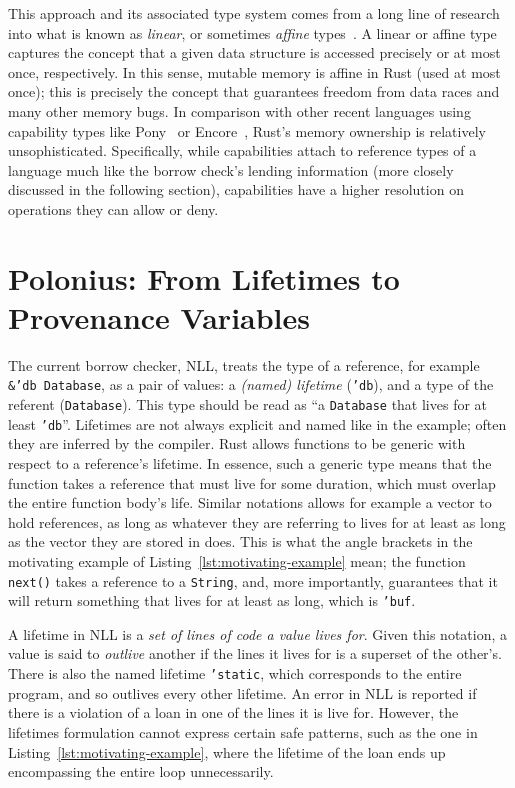 \documentclass[11pt,a4paper,twoside,openany]{report}
\newcommand{\InRust}[1]{\texttt{#1}}
\begin{document}
This approach and its associated type system comes from a long line of research
into what is known as \textit{linear}, or sometimes \textit{affine}
types~\cite{wadler1990linear}. A linear or affine type captures the concept that
a given data structure is accessed precisely or at most once, respectively. In
this sense, mutable memory is affine in Rust (used at most once); this is
precisely the concept that guarantees freedom from data races and many other
memory bugs. In comparison with other recent languages using capability types
like Pony~\cite{clebsch2015pony, Clebsch:2015:DCS:2824815.2824816} or
Encore~\cite{castegren2018capability}, Rust's memory ownership is relatively
unsophisticated. Specifically, while capabilities attach to reference types of a
language much like the borrow check's lending information (more closely
discussed in the following section), capabilities have a higher resolution on
operations they can allow or deny.

\section{Polonius: From Lifetimes to Provenance
  Variables}\label{sec:reference-provenance}

The current borrow checker, NLL, treats the type of a reference, for example
\InRust{&'db Database}, as a pair of values: a \textit{(named) lifetime}
(\InRust{'db}), and a type of the referent (\InRust{Database}). This type should
be read as ``a \InRust{Database} that lives for at least \InRust{'db}''.
Lifetimes are not always explicit and named like in the example; often they are
inferred by the compiler. Rust allows functions to be generic with respect to a
reference's lifetime. In essence, such a generic type means that the function
takes a reference that must live for some duration, which must overlap the
entire function body's life. Similar notations allows for example a vector to
hold references, as long as whatever they are referring to lives for at least as
long as the vector they are stored in does. This is what the angle brackets in
the motivating example of Listing~\ref{lst:motivating-example} mean; the
function \InRust{next()} takes a reference to a \InRust{String}, and, more
importantly, guarantees that it will return something that lives for at least as
long, which is \InRust{'buf}.

A lifetime in NLL is a \textit{set of lines of code a value lives for}. Given
this notation, a value is said to \textit{outlive} another if the lines it lives
for is a superset of the other's. There is also the named lifetime
\InRust{'static}, which corresponds to the entire program, and so outlives every
other lifetime. An error in NLL is reported if there is a violation of a loan in
one of the lines it is live for. However, the lifetimes formulation cannot
express certain safe patterns, such as the one in
Listing~\ref{lst:motivating-example}, where the lifetime of the loan ends up
encompassing the entire loop unnecessarily.
\end{document}

